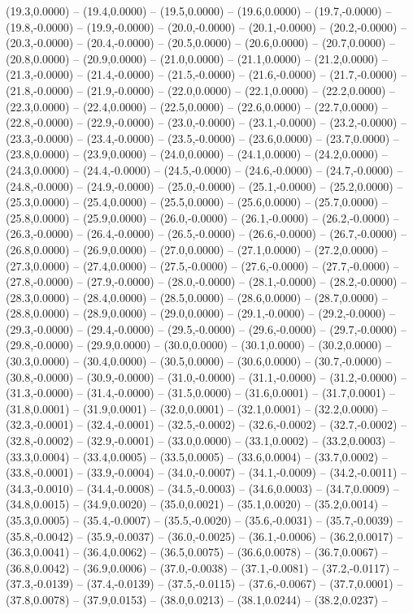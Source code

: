 \documentclass{SVnote}
\begin{document}
(19.3,0.0000) -- (19.4,0.0000) -- (19.5,0.0000) -- (19.6,0.0000) -- (19.7,-0.0000) -- (19.8,-0.0000) -- (19.9,-0.0000) -- (20.0,-0.0000) -- (20.1,-0.0000) -- (20.2,-0.0000) -- (20.3,-0.0000) -- (20.4,-0.0000) -- (20.5,0.0000) -- (20.6,0.0000) -- (20.7,0.0000) -- (20.8,0.0000) -- (20.9,0.0000) -- (21.0,0.0000) -- (21.1,0.0000) -- (21.2,0.0000) -- (21.3,-0.0000) -- (21.4,-0.0000) -- (21.5,-0.0000) -- (21.6,-0.0000) -- (21.7,-0.0000) -- (21.8,-0.0000) -- (21.9,-0.0000) -- (22.0,0.0000) -- (22.1,0.0000) -- (22.2,0.0000) -- (22.3,0.0000) -- (22.4,0.0000) -- (22.5,0.0000) -- (22.6,0.0000) -- (22.7,0.0000) -- (22.8,-0.0000) -- (22.9,-0.0000) -- (23.0,-0.0000) -- (23.1,-0.0000) -- (23.2,-0.0000) -- (23.3,-0.0000) -- (23.4,-0.0000) -- (23.5,-0.0000) -- (23.6,0.0000) -- (23.7,0.0000) -- (23.8,0.0000) -- (23.9,0.0000) -- (24.0,0.0000) -- (24.1,0.0000) -- (24.2,0.0000) -- (24.3,0.0000) -- (24.4,-0.0000) -- (24.5,-0.0000) -- (24.6,-0.0000) -- (24.7,-0.0000) -- (24.8,-0.0000) -- (24.9,-0.0000) -- (25.0,-0.0000) -- (25.1,-0.0000) -- (25.2,0.0000) -- (25.3,0.0000) -- (25.4,0.0000) -- (25.5,0.0000) -- (25.6,0.0000) -- (25.7,0.0000) -- (25.8,0.0000) -- (25.9,0.0000) -- (26.0,-0.0000) -- (26.1,-0.0000) -- (26.2,-0.0000) -- (26.3,-0.0000) -- (26.4,-0.0000) -- (26.5,-0.0000) -- (26.6,-0.0000) -- (26.7,-0.0000) -- (26.8,0.0000) -- (26.9,0.0000) -- (27.0,0.0000) -- (27.1,0.0000) -- (27.2,0.0000) -- (27.3,0.0000) -- (27.4,0.0000) -- (27.5,-0.0000) -- (27.6,-0.0000) -- (27.7,-0.0000) -- (27.8,-0.0000) -- (27.9,-0.0000) -- (28.0,-0.0000) -- (28.1,-0.0000) -- (28.2,-0.0000) -- (28.3,0.0000) -- (28.4,0.0000) -- (28.5,0.0000) -- (28.6,0.0000) -- (28.7,0.0000) -- (28.8,0.0000) -- (28.9,0.0000) -- (29.0,0.0000) -- (29.1,-0.0000) -- (29.2,-0.0000) -- (29.3,-0.0000) -- (29.4,-0.0000) -- (29.5,-0.0000) -- (29.6,-0.0000) -- (29.7,-0.0000) -- (29.8,-0.0000) -- (29.9,0.0000) -- (30.0,0.0000) -- (30.1,0.0000) -- (30.2,0.0000) -- (30.3,0.0000) -- (30.4,0.0000) -- (30.5,0.0000) -- (30.6,0.0000) -- (30.7,-0.0000) -- (30.8,-0.0000) -- (30.9,-0.0000) -- (31.0,-0.0000) -- (31.1,-0.0000) -- (31.2,-0.0000) -- (31.3,-0.0000) -- (31.4,-0.0000) -- (31.5,0.0000) -- (31.6,0.0001) -- (31.7,0.0001) -- (31.8,0.0001) -- (31.9,0.0001) -- (32.0,0.0001) -- (32.1,0.0001) -- (32.2,0.0000) -- (32.3,-0.0001) -- (32.4,-0.0001) -- (32.5,-0.0002) -- (32.6,-0.0002) -- (32.7,-0.0002) -- (32.8,-0.0002) -- (32.9,-0.0001) -- (33.0,0.0000) -- (33.1,0.0002) -- (33.2,0.0003) -- (33.3,0.0004) -- (33.4,0.0005) -- (33.5,0.0005) -- (33.6,0.0004) -- (33.7,0.0002) -- (33.8,-0.0001) -- (33.9,-0.0004) -- (34.0,-0.0007) -- (34.1,-0.0009) -- (34.2,-0.0011) -- (34.3,-0.0010) -- (34.4,-0.0008) -- (34.5,-0.0003) -- (34.6,0.0003) -- (34.7,0.0009) -- (34.8,0.0015) -- (34.9,0.0020) -- (35.0,0.0021) -- (35.1,0.0020) -- (35.2,0.0014) -- (35.3,0.0005) -- (35.4,-0.0007) -- (35.5,-0.0020) -- (35.6,-0.0031) -- (35.7,-0.0039) -- (35.8,-0.0042) -- (35.9,-0.0037) -- (36.0,-0.0025) -- (36.1,-0.0006) -- (36.2,0.0017) -- (36.3,0.0041) -- (36.4,0.0062) -- (36.5,0.0075) -- (36.6,0.0078) -- (36.7,0.0067) -- (36.8,0.0042) -- (36.9,0.0006) -- (37.0,-0.0038) -- (37.1,-0.0081) -- (37.2,-0.0117) -- (37.3,-0.0139) -- (37.4,-0.0139) -- (37.5,-0.0115) -- (37.6,-0.0067) -- (37.7,0.0001) -- (37.8,0.0078) -- (37.9,0.0153) -- (38.0,0.0213) -- (38.1,0.0244) -- (38.2,0.0237) -- 
\end{document}
